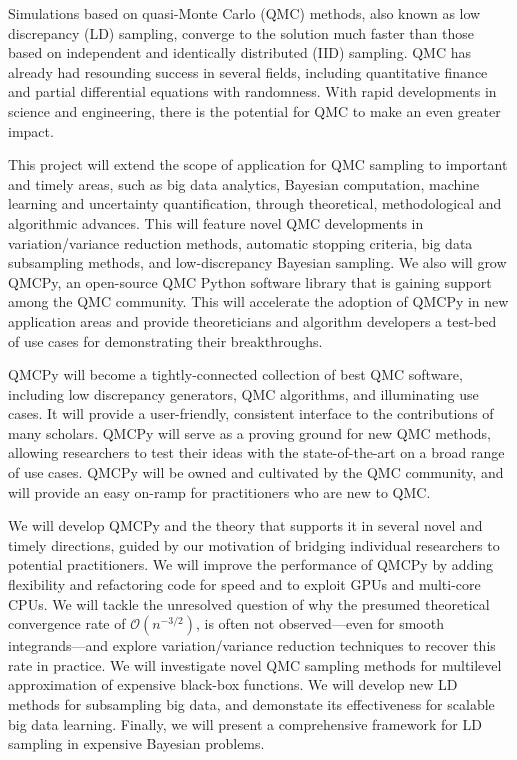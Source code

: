 \documentclass[11pt]{article}%
\begin{document}

\noindent Simulations based on quasi-Monte Carlo (QMC) methods, also known as low discrepancy (LD) sampling, converge to the solution much faster than those based on independent and identically distributed (IID) sampling.  QMC has already had resounding success in several fields, including quantitative finance and partial differential equations with randomness. With rapid developments in science and engineering, there is the potential for QMC to make an even greater impact.

This project will extend the scope of application for QMC sampling to important and timely areas, such as big data analytics, Bayesian computation, machine learning and uncertainty quantification, through theoretical, methodological and algorithmic advances. This will feature novel QMC developments in variation/variance reduction methods, automatic stopping criteria, big data subsampling methods, and low-discrepancy Bayesian sampling. We also will grow QMCPy, an open-source QMC Python software library that is gaining support among the QMC community. This will accelerate the adoption of QMCPy in new application areas and provide theoreticians and algorithm developers a test-bed of use cases for demonstrating their breakthroughs.

QMCPy will become a tightly-connected collection of best QMC software, including low discrepancy generators, QMC algorithms, and illuminating use cases. It will provide a user-friendly, consistent interface to the contributions of many scholars. QMCPy will serve as a proving ground for new QMC methods, allowing researchers to test their ideas with the state-of-the-art on a broad range of use cases. QMCPy will be owned and cultivated by the QMC community, and will provide an easy on-ramp for practitioners who are new to QMC.

\bigskip


\noindent We will develop QMCPy and the theory that supports it in several novel and timely directions, guided by our motivation of bridging individual researchers to potential practitioners. We will improve the performance of QMCPy by adding flexibility and refactoring code for speed and to exploit GPUs and multi-core CPUs.  We will tackle the unresolved question of why the presumed theoretical convergence rate of $\mathcal{O}(n^{-3/2})$, is often not observed---even for smooth integrands---and explore variation/variance reduction techniques to recover this rate in practice. We will investigate novel QMC sampling methods for multilevel approximation of expensive black-box functions. We will develop new LD methods for subsampling big data, and demonstate its effectiveness for scalable big data learning. Finally, we will present a comprehensive framework for LD sampling in expensive Bayesian problems.
\end{document}
